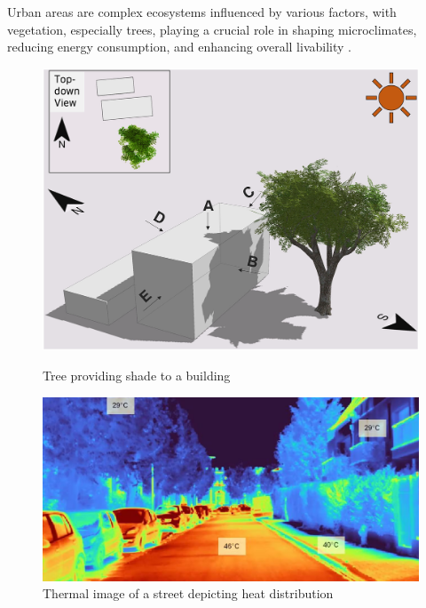 \documentclass[12pt]{article}
\begin{document}
Urban areas are complex ecosystems influenced by various factors, with
vegetation, especially trees, playing a crucial role in shaping microclimates,
reducing energy consumption, and enhancing overall livability \cite{TIR4sTREEt}.

\begin{figure}[H]
    \begin{minipage}{0.45\textwidth}
        \centering
        \includegraphics[width=1\textwidth]{images/TreeShade.png}
        \caption{Tree providing shade to a building \cite{img:TreeShade}}
    \end{minipage}
    \begin{minipage}{0.45\textwidth}
        \centering
        \includegraphics[width=1\textwidth]{images/heat_street.png}
        \caption{Thermal image of a street depicting heat distribution \cite{img:street_thermography}}
    \end{minipage}
\end{figure}
\end{document}
